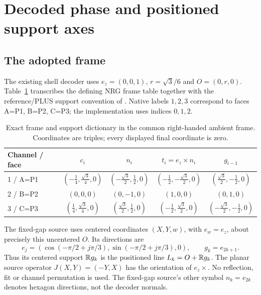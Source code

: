 \section{Decoded phase and positioned support axes}\label{sec:spatial}

\subsection{The adopted frame}
The existing shell decoder uses \(e_z=(0,0,1)\), \(r=\sqrt3/6\) and \(O=(0,r,0)\). Table~\ref{tab:frames} transcribes the defining NRG frame table \cite[Appendix, notation and conventions]{nrg} together with the reference/PLUS support convention of \cite[Sections 1 and 3]{fixedgap}. Native labels \(1,2,3\) correspond to faces A=P1, B=P2, C=P3; the implementation uses indices \(0,1,2\).

\begin{table}[htbp]\centering\small
\caption{Exact frame and support dictionary in the common right-handed ambient frame. Coordinates are triples; every displayed final coordinate is zero.}\label{tab:frames}
\setlength{\tabcolsep}{4pt}\renewcommand{\arraystretch}{1.5}
\begin{tabular}{@{}lcccc@{}}\toprule
Channel / face & \(c_i\) & \(n_i\) & \(t_i=e_z\times n_i\) & \(g_{i-1}\)\\\midrule
1 / A=P1 & \((-\tfrac14,\tfrac{\sqrt3}4,0)\) & \((-\tfrac{\sqrt3}2,\tfrac12,0)\) & \((-\tfrac12,-\tfrac{\sqrt3}2,0)\) & \((\tfrac{\sqrt3}2,-\tfrac12,0)\)\\
2 / B=P2 & \((0,0,0)\) & \((0,-1,0)\) & \((1,0,0)\) & \((0,1,0)\)\\
3 / C=P3 & \((\tfrac14,\tfrac{\sqrt3}4,0)\) & \((\tfrac{\sqrt3}2,\tfrac12,0)\) & \((-\tfrac12,\tfrac{\sqrt3}2,0)\) & \((-\tfrac{\sqrt3}2,-\tfrac12,0)\)\\\bottomrule
\end{tabular}
\end{table}

The fixed-gap source uses centered coordinates \((X,Y,w)\), with \(e_w=e_z\), about precisely this uncentered \(O\). Its directions are
\[
e_j=(\cos(-\pi/2+j\pi/3),\sin(-\pi/2+j\pi/3),0),\qquad g_k=e_{2k+1}.
\]
Thus its centered support \(\mathbb R g_k\) is the positioned line \(L_k=O+\mathbb R g_k\). The planar source operator \(J(X,Y)=(-Y,X)\) has the orientation of \(e_z\times\). No reflection, fit or channel permutation is used. The fixed-gap source's other symbol \(n_k=e_{2k}\) denotes hexagon directions, not the decoder normals.

